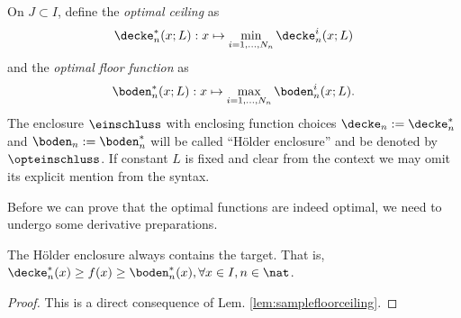 \begin{defn} \label{def:optenclosingfcts} On  $J \subset I$, define the \emph{optimal ceiling} as
\[\decke^*_n (x; L) : x \mapsto  \min_{i=1,\ldots,N_n} \decke^i_n(x;L)\]
and the \emph{optimal floor function} as
 \[\boden^*_n (x; L) :x \mapsto   \max_{i=1,\ldots,N_n} \boden^i_n(x; L).\]
The enclosure $\einschluss$ with enclosing function choices $\decke_n := \decke_n^*$ and $\boden_n := \boden_n^*$ will be called ``H\"older enclosure'' and be denoted by $\opteinschluss$.
If constant $L$ is fixed and clear from the context we may omit its explicit mention from the syntax.
\end{defn}

Before we can prove that the optimal functions are indeed optimal, we need to undergo some derivative preparations.

\begin{lem} \label{lem:optenclcontainstarget}
The H\"older enclosure always contains the target. That is, $\decke^*_n(x) \geq f(x) \geq \boden^*_n(x), \forall x \in I, n \in \nat$.
\begin{proof}
This is a direct consequence of Lem. \ref{lem:samplefloorceiling}.
\end{proof}
\end{lem}


